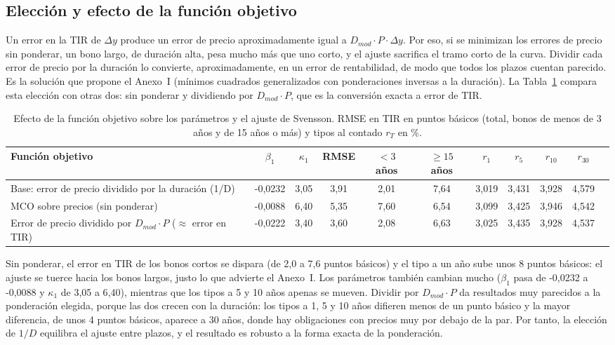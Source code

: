\documentclass[a4paper,12pt]{article}
\begin{document}
\subsection{Elección y efecto de la función objetivo}
\label{sec:objetivo}
Un error en la TIR de $\Delta y$ produce un error de precio aproximadamente igual a $D_{mod}\cdot P\cdot\Delta y$. Por eso, si se minimizan los errores de precio sin ponderar, un bono largo, de duración alta, pesa mucho más que uno corto, y el ajuste sacrifica el tramo corto de la curva. Dividir cada error de precio por la duración lo convierte, aproximadamente, en un error de rentabilidad, de modo que todos los plazos cuentan parecido. Es la solución que propone el Anexo~I (mínimos cuadrados generalizados con ponderaciones inversas a la duración). La Tabla~\ref{tab:objetivo} compara esta elección con otras dos: sin ponderar y dividiendo por $D_{mod}\cdot P$, que es la conversión exacta a error de TIR.
\begin{table}[H]\centering\caption{Efecto de la función objetivo sobre los parámetros y el ajuste de Svensson. RMSE en TIR en puntos básicos (total, bonos de menos de 3 años y de 15 años o más) y tipos al contado $r_T$ en \%.}\label{tab:objetivo}
\scriptsize\setlength{\tabcolsep}{3pt}
\begin{tabular}{p{3.6cm}cccccccccc}\toprule Función objetivo & $\beta_1$ & $\kappa_1$ & RMSE & $<3$ años & $\ge15$ años & $r_1$ & $r_5$ & $r_{10}$ & $r_{30}$\\\midrule
Base: error de precio dividido por la duración (1/D) & -0{,}0232 & 3{,}05 & 3{,}91 & 2{,}01 & 7{,}64 & 3{,}019 & 3{,}431 & 3{,}928 & 4{,}579 \\
MCO sobre precios (sin ponderar) & -0{,}0088 & 6{,}40 & 5{,}35 & 7{,}60 & 6{,}54 & 3{,}099 & 3{,}425 & 3{,}946 & 4{,}542 \\
Error de precio dividido por $D_{mod}\cdot P$ ($\approx$ error en TIR) & -0{,}0222 & 3{,}40 & 3{,}60 & 2{,}08 & 6{,}63 & 3{,}025 & 3{,}435 & 3{,}928 & 4{,}537 \\
\bottomrule\end{tabular}\end{table}
Sin ponderar, el error en TIR de los bonos cortos se dispara (de 2{,}0 a 7{,}6 puntos básicos) y el tipo a un año sube unos 8 puntos básicos: el ajuste se tuerce hacia los bonos largos, justo lo que advierte el Anexo~I. Los parámetros también cambian mucho ($\beta_1$ pasa de -0{,}0232 a -0{,}0088 y $\kappa_1$ de 3{,}05 a 6{,}40), mientras que los tipos a 5 y 10 años apenas se mueven. Dividir por $D_{mod}\cdot P$ da resultados muy parecidos a la ponderación elegida, porque las dos crecen con la duración: los tipos a 1, 5 y 10 años difieren menos de un punto básico y la mayor diferencia, de unos 4 puntos básicos, aparece a 30 años, donde hay obligaciones con precios muy por debajo de la par. Por tanto, la elección de $1/D$ equilibra el ajuste entre plazos, y el resultado es robusto a la forma exacta de la ponderación.
\end{document}
